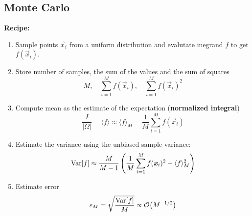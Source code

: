 \subsection{Monte Carlo}
    \textbf{Recipe:}
    \begin{enumerate}
        \item Sample points $\Vec{x}_i$ from a uniform distribution and evalutate inegrand $f$ to get $f(\Vec{x}_i)$.
        
        \item Store number of samples, the sum of the values and the sum of squares
        \begin{equation*}
            M, \quad \sum_{i=1}^M f(\Vec{x}_i), \quad \sum_{i=1}^M f(\Vec{x}_i)^2
        \end{equation*}
\vspace{-2mm}       
        \item Compute mean as the estimate of the expectation (\textbf{normalized integral})
        \begin{equation*}
            \frac{I}{|\Omega|} = \langle f \rangle \approx \langle f \rangle_M = \frac{1}{M}\sum_{i=1}^M f(\Vec{x}_i)
        \end{equation*}
\vspace{-2mm}        
        \item Estimate the variance using the unbiased sample variance:
        \begin{equation*}
            \textnormal{Var}[f] \approx \frac{M}{M-1}\left(\frac{1}{M}\sum_{i=1}^M f(\Vec{x}_i)^2-\langle f \rangle_M^2\right)
        \end{equation*}
\vspace{-2mm}       
        \item Estimate error
        \begin{equation*}
            \varepsilon_M = \sqrt{\frac{\textnormal{Var}[f]}{M}} \propto \mathcal{O}\big(M^{-1/2}\big)
        \end{equation*}
    \end{enumerate}
    